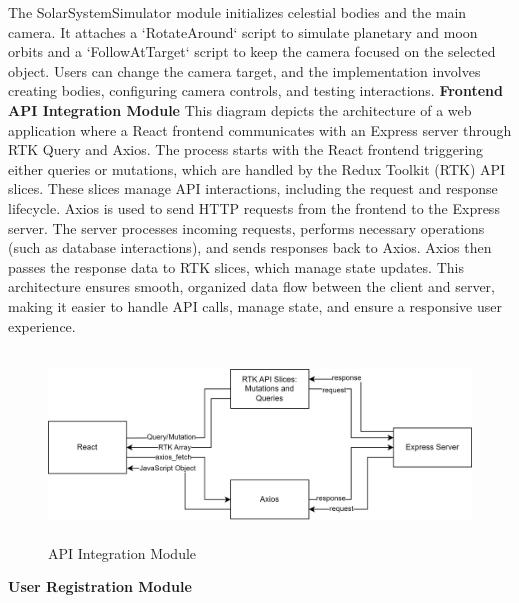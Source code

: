 The SolarSystemSimulator module initializes celestial bodies and the main camera. It attaches a `RotateAround` script to simulate planetary and moon orbits and a `FollowAtTarget` script to keep the camera focused on the selected object. Users can change the camera target, and the implementation involves creating bodies, configuring camera controls, and testing interactions.
\newpage
\textbf{Frontend API Integration Module}\newline
This diagram depicts the architecture of a web application where a React frontend communicates with an Express server through RTK Query and Axios. The process starts with the React frontend triggering either queries or mutations, which are handled by the Redux Toolkit (RTK) API slices. These slices manage API interactions, including the request and response lifecycle. Axios is used to send HTTP requests from the frontend to the Express server. The server processes incoming requests, performs necessary operations (such as database interactions), and sends responses back to Axios. Axios then passes the response data to RTK slices, which manage state updates. This architecture ensures smooth, organized data flow between the client and server, making it easier to handle API calls, manage state, and ensure a responsive user experience.
\begin{figure}[H]
    \centering
     \includegraphics[height = 5cm]{Diagrams/API.png}
     \caption{API Integration Module}
 \end{figure}
\textbf{User Registration Module}

